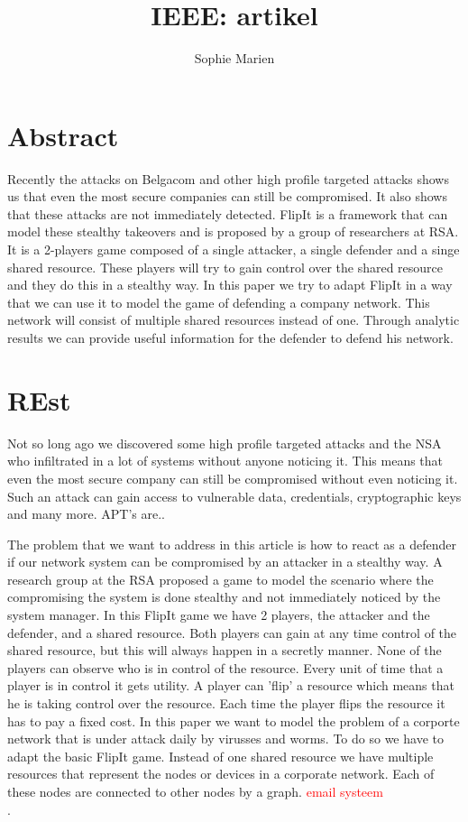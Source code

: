\documentclass[a4paper, 11pt]{article}
\newcommand{\comment}[1]{\textcolor{red}{#1}\\}
\begin{document}
\begin{titlepage}
\title{IEEE: artikel}
\author{Sophie Marien}
\date{} 
\end{titlepage}



\maketitle
\section*{Abstract}
Recently the attacks on Belgacom and other high profile targeted attacks shows us that even the most secure companies can still be compromised. It also shows that these attacks are not immediately detected. FlipIt is a framework that can model these stealthy takeovers and is proposed by a group of researchers at RSA. It is a 2-players game composed of a single attacker, a single defender and a singe shared resource. These players will try to gain control over the shared resource and they do this in a stealthy way. In this paper we try to adapt FlipIt in a way that we can use it to model the game of defending a company network. This network will consist of multiple shared resources instead of one. Through analytic results we can provide useful information for the defender to defend his network.

\section{REst}
 
 Not so long ago we discovered some high profile targeted attacks and the NSA who infiltrated in a lot of systems without anyone noticing it. This means that even the most secure company can still be compromised without even noticing it. Such an attack can gain access to vulnerable data, credentials, cryptographic keys and many more. APT's are..
 
 The problem that we want to address in this article is how to react as a defender if our network system can be compromised by an attacker in a stealthy way. A research group at the RSA proposed a game to model the scenario where the compromising the system is done stealthy and not immediately noticed by the system manager. In this FlipIt game we have 2 players, the attacker and the defender, and a shared resource.
 Both players can gain at any time control of the shared resource, but this will always happen in a secretly manner. None of the players can observe who is in control of the resource. Every unit of time that a player is in control it gets utility. A player can 'flip' a resource which means that he is taking control over the resource. Each time the player flips the resource it has to pay a fixed cost.
 In this paper we want to model the problem of a corporte network that is under attack daily by virusses and worms. To do so we have to adapt the basic FlipIt game. Instead of one shared resource we have multiple resources that represent the nodes or devices in a corporate network. Each of these nodes are connected to other nodes by a graph. \comment{email systeem }.
 
\end{document}
